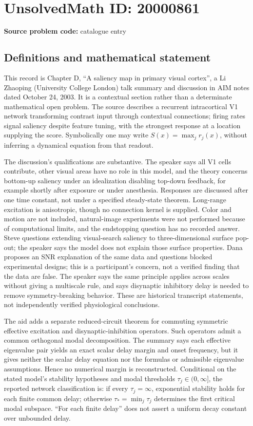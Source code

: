 \documentclass[11pt]{article}
\begin{document}
\section*{UnsolvedMath ID: 20000861}
\textbf{Source problem code:} catalogue entry
\subsection{Definitions and mathematical statement}
This record is Chapter D, ``A saliency map in primary visual cortex'', a Li Zhaoping (University College London) talk summary and discussion in AIM notes dated October 24, 2003. It is a contextual section rather than a determinate mathematical open problem. The source describes a recurrent intracortical V1 network transforming contrast input through contextual connections; firing rates signal saliency despite feature tuning, with the strongest response at a location supplying the score. Symbolically one may write $S(x)=\max_j r_j(x)$, without inferring a dynamical equation from that readout.

The discussion's qualifications are substantive. The speaker says all V1 cells contribute, other visual areas have no role in this model, and the theory concerns bottom-up saliency under an idealization disabling top-down feedback, for example shortly after exposure or under anesthesia. Responses are discussed after one time constant, not under a specified steady-state theorem. Long-range excitation is anisotropic, though no connection kernel is supplied. Color and motion are not included, natural-image experiments were not performed because of computational limits, and the endstopping question has no recorded answer. Steve questions extending visual-search saliency to three-dimensional surface pop-out; the speaker says the model does not explain those surface properties. Dana proposes an SNR explanation of the same data and questions blocked experimental designs; this is a participant's concern, not a verified finding that the data are false. The speaker says the same principle applies across scales without giving a multiscale rule, and says disynaptic inhibitory delay is needed to remove symmetry-breaking behavior. These are historical transcript statements, not independently verified physiological conclusions.

The aid adds a separate reduced-circuit theorem for commuting symmetric effective excitation and disynaptic-inhibition operators. Such operators admit a common orthogonal modal decomposition. The summary says each effective eigenvalue pair yields an exact scalar delay margin and onset frequency, but it gives neither the scalar delay equation nor the formulas or admissible eigenvalue assumptions. Hence no numerical margin is reconstructed. Conditional on the stated model's stability hypotheses and modal thresholds $\tau_j\in(0,\infty]$, the reported network classification is: if every $\tau_j=\infty$, exponential stability holds for each finite common delay; otherwise $\tau_* =\min_j\tau_j$ determines the first critical modal subspace. ``For each finite delay'' does not assert a uniform decay constant over unbounded delay.
\end{document}
